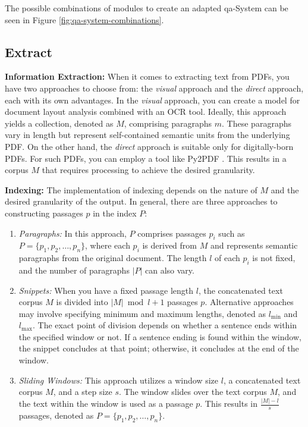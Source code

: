 The possible combinations of modules to create an adapted \gls{qa}-System can be seen in Figure \ref{fig:qa-system-combinations}.


\subsection{Extract}
\label{subsec:extract}

\textbf{Information Extraction:} When it comes to extracting text from PDFs, you have two approaches to choose from: the \textit{visual} approach and the \textit{direct} approach, each with its own advantages. In the \textit{visual} approach, you can create a model for document layout analysis combined with an OCR tool. Ideally, this approach yields a collection, denoted as $M$, comprising paragraphs $m$. These paragraphs vary in length but represent self-contained semantic units from the underlying PDF. On the other hand, the \textit{direct} approach is suitable only for digitally-born PDFs. For such PDFs, you can employ a tool like Py2PDF \cite{noauthor_welcome_nodate}. This results in a corpus $M$ that requires processing to achieve the desired granularity.

\noindent\textbf{Indexing:} The implementation of indexing depends on the nature of $M$ and the desired granularity of the output. In general, there are three approaches to constructing passages $p$ in the index $P$:

\begin{enumerate}
    \item \textit{Paragraphs:} In this approach, $P$ comprises passages $p_i$ such as $P = \{p_1, p_2, \ldots, p_n\}$, where each $p_i$ is derived from $M$ and represents semantic paragraphs from the original document. The length $l$ of each $p_i$ is not fixed, and the number of paragraphs $|P|$ can also vary.
    \item \textit{Snippets:} When you have a fixed passage length $l$, the concatenated text corpus $M$ is divided into $|M|\bmod{l} + 1$ passages $p$. Alternative approaches may involve specifying minimum and maximum lengths, denoted as $l_{\text{min}}$ and $l_{\text{max}}$. The exact point of division depends on whether a sentence ends within the specified window or not. If a sentence ending is found within the window, the snippet concludes at that point; otherwise, it concludes at the end of the window.
    \item \textit{Sliding Windows:} This approach utilizes a window size $l$, a concatenated text corpus $M$, and a step size $s$. The window slides over the text corpus $M$, and the text within the window is used as a passage $p$. This results in $\frac{|M| - l}{s}$ passages, denoted as $P = \{p_1, p_2, \ldots, p_n\}$.
\end{enumerate}

